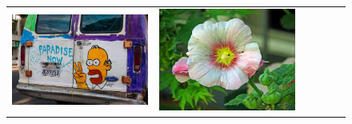 \begin{figure}
\begin{minipage}[t]{\textwidth}
\begin{tabular}{m{.01\linewidth} m{.16\linewidth} m{.16\linewidth} m{.16\linewidth} m{.16\linewidth} m{.16\linewidth}}
    \includegraphics[width=\linewidth]{../style/figures/flickr_on_flickr/pred_style_Detailed/2.jpg} &
    \includegraphics[width=\linewidth]{../style/figures/flickr_on_flickr/pred_style_Detailed/3.jpg} &

\end{tabular}
\end{minipage}
\end{figure}
